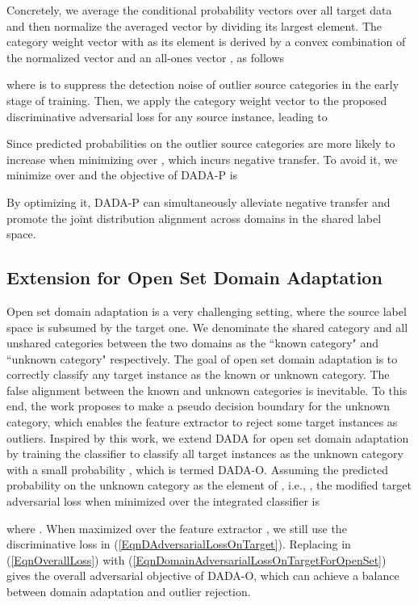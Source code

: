 \documentclass[letterpaper]{article} \usepackage{aaai20}  \usepackage{times}  \usepackage{helvet} \usepackage{courier}  \usepackage[hyphens]{url}  \usepackage{graphicx} \urlstyle{rm} \def\UrlFont{\rm}  \usepackage{graphicx}  \frenchspacing  \setlength{\pdfpagewidth}{8.5in}  \setlength{\pdfpageheight}{11in}
\begin{document}
Concretely, we average the conditional probability vectors  over all target data and then normalize the averaged vector  by dividing its largest element. The category weight vector  with  as its  element is derived by a convex combination of the normalized vector and an all-ones vector , as follows 

where  is to suppress the detection noise of outlier source categories in the early stage of training. Then, we apply the category weight vector  to the proposed discriminative adversarial loss for any source instance, leading to 



Since predicted probabilities on the outlier source categories are more likely to increase when minimizing  over , which incurs negative transfer. To avoid it, we minimize  over  and the objective of DADA-P is 

By optimizing it, DADA-P can simultaneously alleviate negative transfer and promote the joint distribution alignment across domains in the shared label space.

\subsection{Extension for Open Set Domain Adaptation}
Open set domain adaptation is a very challenging setting, where the source label space is subsumed by the target one. We denominate the shared category and all unshared categories between the two domains as the ``known category" and ``unknown category" respectively. The goal of open set domain adaptation is to correctly classify any target instance as the known or unknown category. The false alignment between the known and unknown categories is inevitable. To this end, the work \cite{bp_for_os} proposes to make a pseudo decision boundary for the unknown category, which enables the feature extractor to reject some target instances as outliers. Inspired by this work, we extend DADA for open set domain adaptation by training the classifier to classify all target instances as the unknown category with a small probability , which is termed DADA-O. Assuming the predicted probability on the unknown category as the  element of , i.e., , the modified target adversarial loss when minimized over the integrated classifier  is 

where . When maximized over the feature extractor , we still use the discriminative loss  in (\ref{EqnDAdversarialLossOnTarget}). Replacing  in (\ref{EqnOverallLoss}) with (\ref{EqnDomainAdversarialLossOnTargetForOpenSet}) gives the overall adversarial objective of DADA-O, which can achieve a balance between domain adaptation and outlier rejection.
\end{document}
